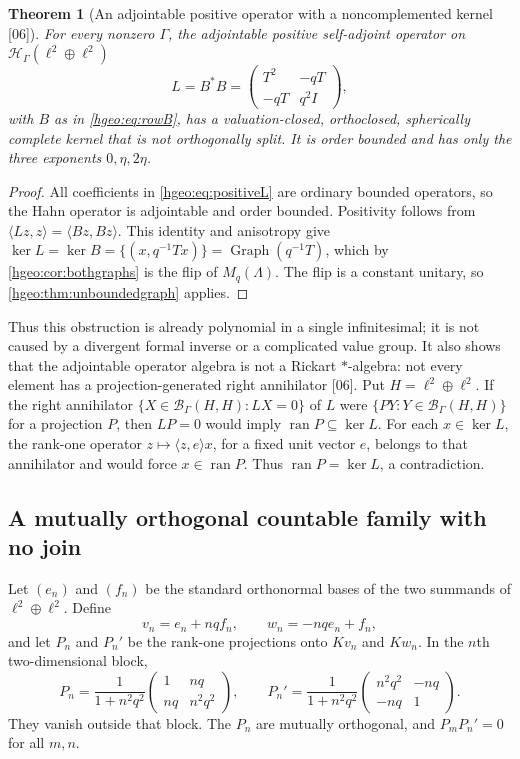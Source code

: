 \documentclass[11pt,letterpaper]{article}
\numberwithin{equation}{section}
\newtheorem{theorem}{Theorem}[section]
\theoremstyle{definition}
\theoremstyle{remark}
\newcommand{\K}{K}
\newcommand{\HH}[1]{\mathscr H_\Gamma(#1)}
\newcommand{\BH}{\mathscr B_\Gamma(H,H)}
\newcommand{\ran}{\operatorname{ran}}
\newcommand{\Graph}{\operatorname{Graph}}
\newcommand{\ip}[2]{\langle #1,#2\rangle}
\newcommand{\src}[1]{\textup{\textsf{\small[#1]}}}
\begin{document}
\begin{theorem}[An adjointable positive operator with a noncomplemented kernel
\src{06}]\label{hgeo:thm:positivekernel}
For every nonzero $\Gamma$, the adjointable positive self-adjoint operator on
$\HH{\ell^2\oplus\ell^2}$
\begin{equation}\label{hgeo:eq:positiveL}
 L=B^*B=
 \begin{pmatrix}
 T^2&-qT\\ -qT&q^2I
 \end{pmatrix},
\end{equation}
with $B$ as in \eqref{hgeo:eq:rowB}, has a valuation-closed, orthoclosed,
spherically complete kernel that is not orthogonally split. It is order
bounded and has only the three exponents $0,\eta,2\eta$.
\end{theorem}
\begin{proof}
All coefficients in \eqref{hgeo:eq:positiveL} are ordinary bounded
operators, so the Hahn operator is adjointable and order bounded.
Positivity follows from $\ip{Lz}{z}=\ip{Bz}{Bz}$. This identity and
anisotropy give $\ker L=\ker B=\{(x,q^{-1}Tx)\}=\Graph(q^{-1}T)$, which by
\cref{hgeo:cor:bothgraphs} is the flip of $M_q(\Lambda)$. The flip is a
constant unitary, so \cref{hgeo:thm:unboundedgraph} applies.
\end{proof}

Thus this obstruction is already polynomial in a single infinitesimal; it is
not caused by a divergent formal inverse or a complicated value group. It
also shows that the adjointable operator algebra is not a Rickart
$*$-algebra: not every element has a projection-generated right
annihilator \src{06}. Put $H=\ell^2\oplus\ell^2$. If the right annihilator
$\{X\in\BH:LX=0\}$ of $L$ were $\{PY:Y\in\BH\}$ for a projection $P$, then
$LP=0$ would imply $\ran P\subseteq\ker L$. For each
$x\in\ker L$, the rank-one operator $z\mapsto\ip{z}{e}x$, for a fixed unit
vector $e$, belongs to that annihilator and would force $x\in\ran P$. Thus
$\ran P=\ker L$, a contradiction.

\subsection{A mutually orthogonal countable family with no join}
\label{hgeo:sub:countable}
Let $(e_n)$ and $(f_n)$ be the standard orthonormal bases of the two
summands of $\ell^2\oplus\ell^2$. Define
\[
 v_n=e_n+nqf_n,\qquad w_n=-nqe_n+f_n,
\]
and let $P_n$ and $P_n'$ be the rank-one projections onto $\K v_n$ and
$\K w_n$. In the $n$th two-dimensional block,
\begin{equation}\label{hgeo:eq:Pn}
 P_n=\frac1{1+n^2q^2}
 \begin{pmatrix}1&nq\\nq&n^2q^2\end{pmatrix},\qquad
 P_n'=\frac1{1+n^2q^2}
 \begin{pmatrix}n^2q^2&-nq\\-nq&1\end{pmatrix}.
\end{equation}
They vanish outside that block. The $P_n$ are mutually orthogonal,
and $P_mP_n'=0$ for all $m,n$.
\end{document}
